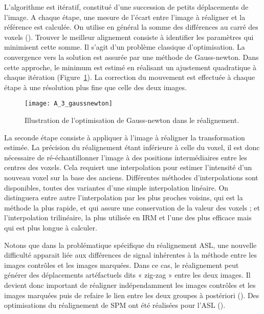 L’algorithme est itératif, constitué d’une succession de petits déplacements de l’image. A
chaque étape, une mesure de l’écart entre l’image à réaligner et la référence est calculée. On utilise
en général la somme des différences au carré des voxels (\cite{Ashburner1997}). Trouver le meilleur alignement consiste
à identifier les paramètres qui minimisent cette somme. Il s’agit d’un problème classique
d’optimisation. La convergence vers la solution est assurée par une méthode de Gauss-newton. Dans
cette approche, le minimum est estimé en réalisant un ajustement quadratique à chaque itération
(Figure~\ref{fig:A_3_gaussnewton}). La correction du mouvement est effectuée à chaque étape à une résolution plus fine que
celle des deux images. 

\begin{figure}[!t]
\centering
\texttt{[image: A\_3\_gaussnewton]}
\caption{Illustration de l’optimisation de Gauss-newton dans le réalignement.}
\label{fig:A_3_gaussnewton}	
\end{figure}
La seconde étape consiste à appliquer à l’image à réaligner la transformation estimée. La
précision du réalignement étant inférieure à celle du voxel, il est donc nécessaire de ré-échantillonner
l’image à des positions intermédiaires entre les centres des voxels. Cela requiert une interpolation
pour estimer l’intensité d’un nouveau voxel sur la base des anciens. Différentes méthodes
d’interpolations sont disponibles, toutes des variantes d’une simple interpolation linéaire. On
distinguera entre autre l’interpolation par les plus proches voisins, qui est la méthode la plus rapide,
et qui assure une conservation de la valeur des voxels ; et l’interpolation trilinéaire, la plus utilisée en
IRM et l’une des plus efficace mais qui est plus longue à calculer.

Notons que dans la problématique spécifique du réalignement ASL, une nouvelle difficulté
apparait liée aux différences de signal inhérentes à la méthode entre les images contrôles et les images
marquées. Dans ce cas, le réalignement peut générer des déplacements artéfactuels dits « zig-zag »
entre les deux images. Il devient donc important de réaligner indépendamment les images contrôles
et les images marquées puis de refaire le lien entre les deux groupes à postériori (\cite{Wang2008}). Des
optimisations du réalignement de SPM ont été réalisées pour l’ASL (\cite{Wang2012}).

